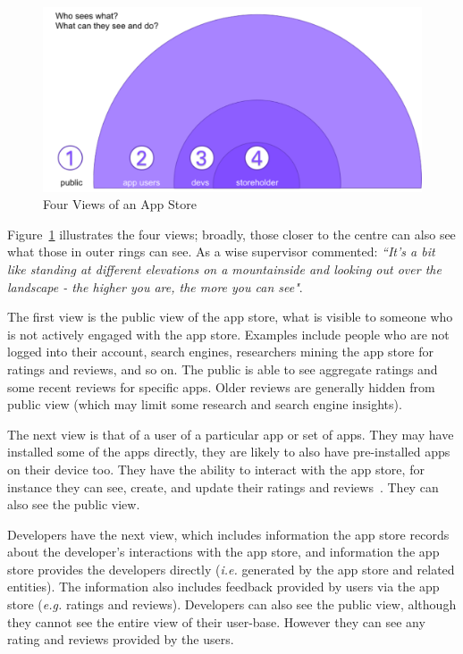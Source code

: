 \begin{figure}
    \includegraphics[width=\linewidth]{images/my/who-sees-what.pdf}
    \caption{Four Views of an App Store}
    \label{fig:4-views-of-apps-in-app-store}
\end{figure}

Figure~\ref{fig:4-views-of-apps-in-app-store} illustrates the four views; broadly, those closer to the centre can also see what those in outer rings can see. As a wise supervisor commented: \emph{``It's a bit like standing at different elevations on a mountainside and looking out over the landscape - the higher you are, the more you can see"}.

The first view is the public view of the app store, what is visible to someone who is not actively engaged with the app store. Examples include people who are not logged into their account, search engines, researchers mining the app store for ratings and reviews, and so on. The public is able to see aggregate ratings and some recent reviews for specific apps. Older reviews are generally hidden from public view (which may limit some research and search engine insights).

The next view is that of a user of a particular app or set of apps. They may have installed some of the apps directly, they are likely to also have pre-installed apps on their device too. They have the ability to interact with the app store, for instance they can see, create, and update their ratings and reviews~. They can also see the public view.

Developers have the next view, which includes information the app store records about the developer's interactions with the app store, and information the app store provides the developers directly (\emph{i.e.} generated by the app store and related entities). The information also includes feedback provided by users via the app store (\emph{e.g.} ratings and reviews). Developers can also see the public view, although they cannot see the entire view of their user-base. However they can see any rating and reviews provided by the users.

